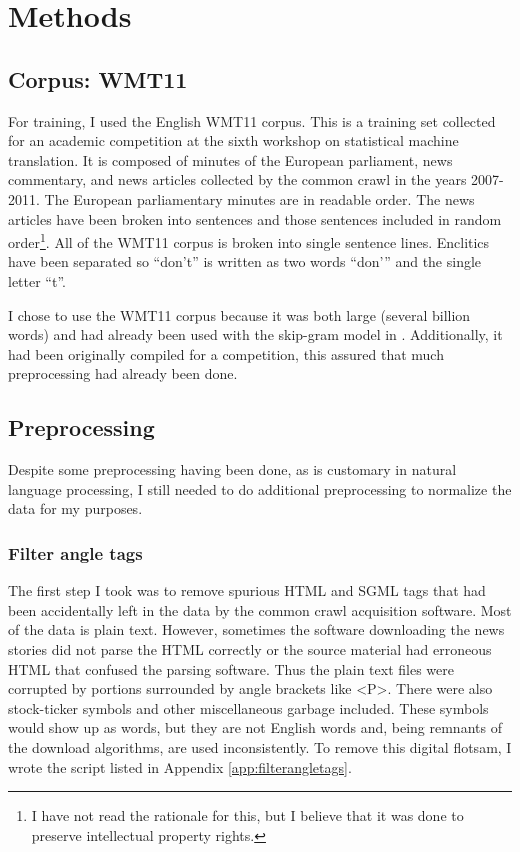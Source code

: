 \documentclass[eric_thesis.tex]{subfiles}
\begin{document}
\chapter{Methods}

\section{Corpus: WMT11}

For training, I used the English WMT11 corpus. This is a training set collected 
for an academic competition at the sixth workshop on statistical machine 
translation. It is composed of minutes of the European parliament, news 
commentary, and news articles collected by the common crawl in the years 
2007-2011. The European parliamentary minutes are in 
readable order. The news articles have been broken into sentences and those 
sentences included in random order\footnote{I have not read the rationale for 
this, but I believe that it was done to preserve intellectual property rights.}. 
All of the WMT11 corpus is broken into single sentence lines. Enclitics have 
been separated so ``don't'' is written as two words ``don'\phantom{}'' and the 
single letter ``t''.

I chose to use the WMT11 corpus because it was both large (several billion 
words) and had already been used with the skip-gram model in . Additionally, it had been originally 
compiled for a competition, this assured that much preprocessing had already 
been done.

\section{Preprocessing}

Despite some preprocessing having been done, as is customary in natural language 
processing, I still needed to do additional preprocessing to normalize the data 
for my purposes.

\subsection{Filter angle tags}

The first step I took was to remove spurious HTML and SGML tags that had been 
accidentally left in the data by the common crawl acquisition software. Most of 
the data is plain text. However, sometimes the software downloading the news 
stories did not parse the HTML correctly or the source material had erroneous 
HTML that confused the parsing software. Thus the plain text files were 
corrupted by portions surrounded by angle brackets like <P>. There were also 
stock-ticker symbols and other miscellaneous garbage included. These symbols 
would show up as words, but they are not English words and, being remnants of 
the download algorithms, are used inconsistently. To remove this digital 
flotsam, I wrote the script  listed in 
Appendix \ref{app:filterangletags}.
\end{document}
